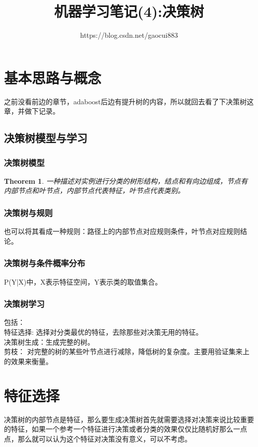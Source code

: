 \documentclass[UTF8]{ctexart}
\title{机器学习笔记(4):决策树}
\author{https://blog.csdn.net/gaocui883}
\newtheorem{thm}{\bf Theorem}[section]
\begin{document}
 
\maketitle
 
\section{基本思路与概念}
之前没看前边的章节，adaboost后边有提升树的内容，所以就回去看了下决策树这章，并做下记录。
\subsection{决策树模型与学习} 
\subsubsection{决策树模型}



\begin{thm}\label{thm1}
	一种描述对实例进行分类的树形结构，结点和有向边组成，节点有内部节点和叶节点，内部节点代表特征，叶节点代表类别。
\end{thm} 
\subsubsection{决策树与规则}
也可以将其看成一种规则：路径上的内部节点对应规则条件，叶节点对应规则结论。
\subsubsection{决策树与条件概率分布}
P(Y|X)中，X表示特征空间，Y表示类的取值集合。


\subsubsection{决策树学习}
\noindent 包括：\\
特征选择: \quad 选择对分类最优的特征，去除那些对决策无用的特征。\\
决策树生成：\quad 生成完整的树。\\
剪枝： \quad 对完整的树的某些叶节点进行减除，降低树的复杂度。主要用验证集来上的效果来衡量。\\

\section{特征选择}
决策树的内部节点是特征，那么要生成决策树首先就需要选择对决策来说比较重要的特征，如果一个参考一个特征进行决策或者分类的效果仅仅比随机好那么一点点，那么就可以认为这个特征对决策没有意义，可以不考虑。
\end{document}
